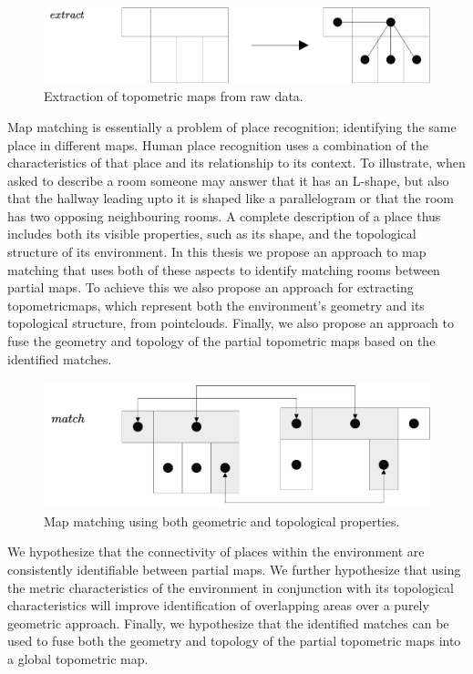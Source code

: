 \begin{figure}[h]
    \centering
    \includegraphics*[width=.8\textwidth]{./fig/overview_diagrams-Page-2.drawio.pdf}
    \caption{Extraction of topometric maps from raw data.}
    \label{fig:overview}
\end{figure}


Map matching is essentially a problem of place recognition; identifying the same place in different maps. Human place recognition uses a combination of the characteristics of that place and its relationship to its context. To illustrate, when asked to describe a room someone may answer that it has an L-shape, but also that the hallway leading upto it is shaped like a parallelogram or that the room has two opposing neighbouring rooms. A complete description of a place thus includes both its visible properties, such as its shape, and the topological structure of its environment. In this thesis we propose an approach to map matching that uses both of these aspects to identify matching rooms between partial maps. To achieve this we also propose an approach for extracting \gls{topometricmap}s, which represent both the environment's geometry and its topological structure, from \gls{pointcloud}s. Finally, we also propose an approach to fuse the geometry and topology of the partial topometric maps based on the identified matches.

\begin{figure}[h]
    \centering
    \includegraphics*[width=.8\textwidth]{./fig/overview_diagrams-Page-3.drawio.pdf}
    \caption{Map matching using both geometric and topological properties.}
    \label{fig:overview_diagram}

\end{figure}


We hypothesize that the connectivity of places within the environment are consistently identifiable between partial maps. We further hypothesize that using the metric characteristics of the environment in conjunction with its topological characteristics will improve identification of overlapping areas over a purely geometric approach. Finally, we hypothesize that the identified matches can be used to fuse both the geometry and topology of the partial topometric maps into a global topometric map.

